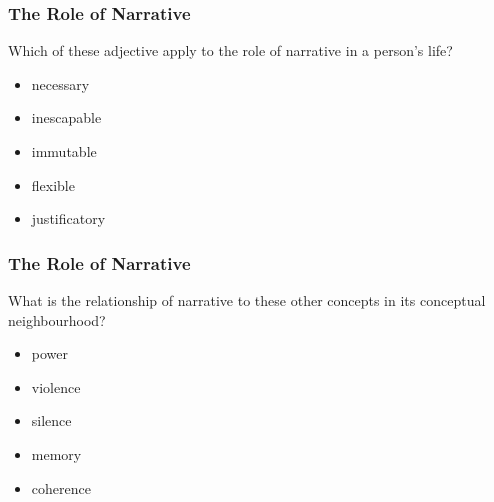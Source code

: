 \documentclass[xcolor=dvipsnames]{beamer}
\begin{document}

\begin{frame}
  \frametitle{The Role of Narrative}
Which of these adjective apply to the role of narrative in a person's
life?
\begin{itemize}
\item necessary
\item inescapable
\item immutable
\item flexible
\item justificatory
\end{itemize}
\end{frame}

\begin{frame}
  \frametitle{The Role of Narrative}
What is the relationship of narrative to these other concepts in its
conceptual neighbourhood?
\begin{itemize}
\item power
\item violence
\item silence
\item memory
\item coherence
\end{itemize}
\end{frame}
\end{document}
